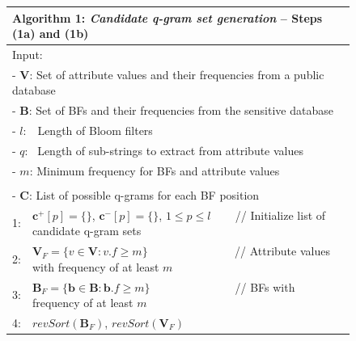 \documentclass{llncs}
\begin{document}





\begin{figure}[t]
  \begin{center}
  \begin{scriptsize}
  \begin{tabular}{ll} \hline
\multicolumn{2}{l}{\textbf{Algorithm 1: \emph{Candidate q-gram set
  generation}} -- Steps (1a) and (1b) } \\ \hline
\multicolumn{2}{l}{Input:} \\
\multicolumn{2}{l}{- $\mathbf{V}$: Set of attribute values and their
  frequencies from a public database} \\
\multicolumn{2}{l}{- $\mathbf{B}$: Set of BFs and their
  frequencies from the sensitive database} \\
\multicolumn{2}{l}{- $l$:~\, Length of Bloom filters} \\
\multicolumn{2}{l}{- $q$:~ Length of sub-strings to extract from
  attribute values} \\  
\multicolumn{2}{l}{- $m$: Minimum frequency for BFs and attribute
  values} \\
\noalign{\smallskip}
\multicolumn{2}{l}{Output:} \\
\multicolumn{2}{l}{- $\mathbf{C}$: List of possible q-grams for each
  BF position} \\
\noalign{\smallskip}
  1:  & $\mathbf{c}^+[p] = \{\}$, $\mathbf{c}^-[p] = \{\}$,
        $1 \le p \le l$ ~~~ // Initialize list of candidate q-gram
        sets \\
  2:  & $\mathbf{V}_F = \{v \in \mathbf{V}: v.f \ge m \}$
        ~~~~~~~~~~~~~~ // Attribute values with frequency of at
        least $m$ \\
  3:  & $\mathbf{B}_F = \{\mathbf{b} \in \mathbf{B}:
        \mathbf{b}.f \ge m \}$
        ~~~~~~~~~~~~~~\,// BFs with frequency of at least $m$ \\
  4:  & $revSort(\mathbf{B}_F)$, $revSort(\mathbf{V}_F)$ ~~~~~~~~~~ 

\end{tabular}
\end{scriptsize}
\end{center}
\end{figure}
\end{document}
